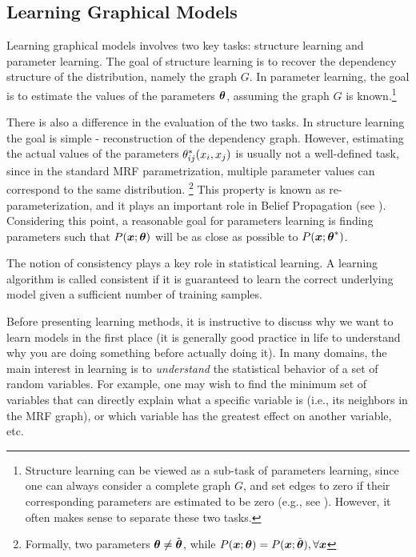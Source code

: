 \subsection{Learning Graphical Models}
\label{sec:learning}
Learning graphical models involves two key tasks: structure learning and parameter learning.
The goal of structure learning is to recover the dependency structure of the distribution, namely the graph $G$.
In parameter learning, the goal is to estimate the values of the parameters $\boldsymbol{\theta}$, assuming the graph $G$ is known.\footnote{Structure learning can be viewed as a sub-task of parameters learning, since one can always consider a complete graph $G$, and set edges to zero if their corresponding parameters are estimated to be zero (e.g., see \cite{ravikumar2010high}). However, it often makes sense to separate these two tasks.}

There is also a difference in the evaluation of the two tasks.
In structure learning the goal is simple - reconstruction of the dependency graph.
However, estimating the actual values of the parameters ${\theta}^{*}_{ij}(x_i,x_j)$ is usually not a well-defined task, since in the standard MRF parametrization, multiple 
parameter values can correspond to the same distribution. \footnote{Formally, two parameters $\boldsymbol{\theta} \neq \tilde{\boldsymbol{\theta}}$, while $P(\boldsymbol{x}; \boldsymbol{\theta}) = P(\boldsymbol{x}; \tilde{\boldsymbol{\theta}}), \forall \boldsymbol{x}$}
This property is known as re-parameterization, and it plays an important role in Belief Propagation (see ). Considering this point, a reasonable goal for parameters learning is finding parameters such that $P(\boldsymbol{x};\boldsymbol{\theta})$ will be as close as possible to $P(\boldsymbol{x};{\boldsymbol{\theta}}^{*})$. 

The notion of consistency plays a key role in statistical learning. A learning algorithm is called consistent if it is guaranteed to learn the correct underlying model given a sufficient number of training samples. 

Before presenting learning methods, it is instructive to discuss why we want to learn models in the first place (it is generally good practice in life to understand why you are doing something before actually doing it). 
In many domains, the main interest in learning is to {\em understand} the statistical behavior of a set of random variables.
For example, one may wish to find the minimum set of variables that can directly explain what a specific variable is (i.e., its neighbors in the MRF graph), or which variable has the greatest effect on another variable, etc.

